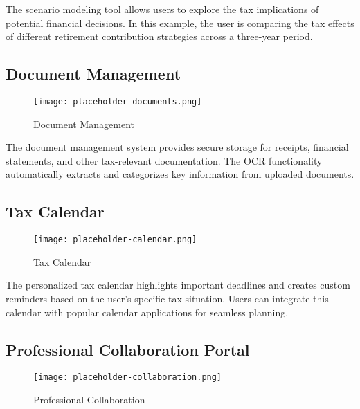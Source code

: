 \documentclass[
  11pt,
  letterpaper,
]{article}
\begin{document}
The scenario modeling tool allows users to explore the tax implications
of potential financial decisions. In this example, the user is comparing
the tax effects of different retirement contribution strategies across a
three-year period.

\hypertarget{document-management}{%
\subsection{Document Management}\label{document-management}}

\begin{figure}

{\centering \texttt{[image: placeholder-documents.png]}

}

\caption{Document Management}

\end{figure}

The document management system provides secure storage for receipts,
financial statements, and other tax-relevant documentation. The OCR
functionality automatically extracts and categorizes key information
from uploaded documents.

\hypertarget{tax-calendar}{%
\subsection{Tax Calendar}\label{tax-calendar}}

\begin{figure}

{\centering \texttt{[image: placeholder-calendar.png]}

}

\caption{Tax Calendar}

\end{figure}

The personalized tax calendar highlights important deadlines and creates
custom reminders based on the user's specific tax situation. Users can
integrate this calendar with popular calendar applications for seamless
planning.

\hypertarget{professional-collaboration-portal}{%
\subsection{Professional Collaboration
Portal}\label{professional-collaboration-portal}}

\begin{figure}

{\centering \texttt{[image: placeholder-collaboration.png]}

}

\caption{Professional Collaboration}

\end{figure}
\end{document}

